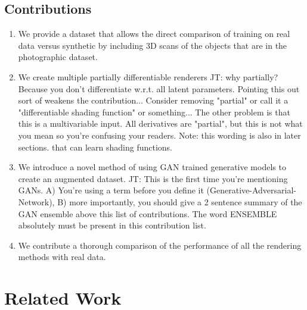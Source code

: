 \documentclass[10pt,twocolumn,letterpaper]{article}
\newcommand{\tompson}[1]{{\color{green} JT: #1}}
\begin{document}
\subsection{Contributions}
\begin{enumerate}
\item We provide a dataset that allows the direct comparison of training on real data versus synthetic by including 3D scans of the objects that are in the photographic dataset.
\item We create multiple partially differentiable renderers \tompson{why partially? Because you don't differentiate w.r.t. all latent parameters. Pointing this out sort of weakens the contribution... Consider removing "partial" or call it a "differentiable shading function" or something... The other problem is that this is a multivariable input. All derivatives are "partial", but this is not what you mean so you're confusing your readers. Note: this wording is also in later sections.} that can learn shading functions.
\item We introduce a novel method of using GAN trained generative models to create an augmented dataset. \tompson{This is the first time you're mentioning GANs. A) You're using a term before you define it (Generative-Adversarial-Network), B) more importantly, you should give a 2 sentence summary of the GAN ensemble above this list of contributions. The word ENSEMBLE absolutely must be present in this contribution list.}
\item We contribute a thorough comparison of the performance of all the rendering methods with real data.
\end{enumerate}
\section{Related Work}
\end{document}
